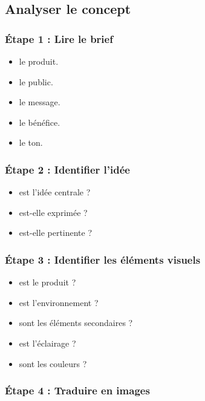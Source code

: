 \subsection{Analyser le concept}

\subsubsection{Étape 1 : Lire le brief}

\begin{itemize}
    \item {} le produit.
    \item {} le public.
    \item {} le message.
    \item {} le bénéfice.
    \item {} le ton.
\end{itemize}

\subsubsection{Étape 2 : Identifier l'idée}

\begin{itemize}
    \item {} est l'idée centrale ?
    \item {} est-elle exprimée ?
    \item {} est-elle pertinente ?
\end{itemize}

\subsubsection{Étape 3 : Identifier les éléments visuels}

\begin{itemize}
    \item {} est le produit ?
    \item {} est l'environnement ?
    \item {} sont les éléments secondaires ?
    \item {} est l'éclairage ?
    \item {} sont les couleurs ?
\end{itemize}

\subsubsection{Étape 4 : Traduire en images}

